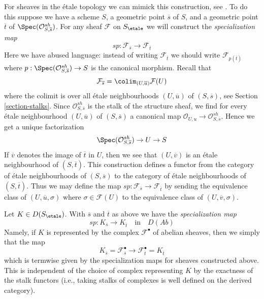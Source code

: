 \medskip\noindent
For sheaves in the \'etale topology we can mimick this construction, see
\cite[Exposee VII, 7.7, page 397]{SGA4}. To do this suppose we have
a scheme $S$, a geometric point $\overline{s}$ of $S$, and a geometric
point $\overline{t}$ of $\Spec(\mathcal{O}^{sh}_{S, \overline{s}})$.
For any sheaf $\mathcal{F}$ on $S_\etale$ we will construct the
{\it specialization map}
$$
sp : \mathcal{F}_{\overline{s}} \longrightarrow \mathcal{F}_{\overline{t}}
$$
Here we have abused language: instead of writing
$\mathcal{F}_{\overline{t}}$ we should write $\mathcal{F}_{p(\overline{t})}$
where $p : \Spec(\mathcal{O}^{sh}_{S, \overline{s}}) \to S$ is the canonical
morphism. Recall that
$$
\mathcal{F}_{\overline{s}} = \colim_{(U, \overline{u})} \mathcal{F}(U)
$$
where the colimit is over all \'etale neighbourhoods $(U, \overline{u})$
of $(S, \overline{s})$, see Section \ref{section-stalks}. Since
$\mathcal{O}^{sh}_{S, \overline{s}}$ is the stalk of the
structure sheaf, we find for every \'etale neighbourhood
$(U, \overline{u})$ of $(S, \overline{s})$ a canonical map
$\mathcal{O}_{U, u} \to \mathcal{O}^{sh}_{S, \overline{s}}$.
Hence we get a unique factorization
$$
\Spec(\mathcal{O}^{sh}_{S, \overline{s}}) \to U \to S
$$
If $\overline{v}$ denotes the image of $\overline{t}$ in $U$, then we see that
$(U, \overline{v})$ is an \'etale neighbourhood of $(S, \overline{t})$.
This construction defines a functor from the category of \'etale neighbourhoods
of $(S, \overline{s})$ to the category of \'etale neighbourhoods of
$(S, \overline{t})$. Thus we may define the map
$sp : \mathcal{F}_{\overline{s}} \to \mathcal{F}_{\overline{t}}$
by sending the equivalence class of
$(U, \overline{u}, \sigma)$ where $\sigma \in \mathcal{F}(U)$
to the equivalence class of $(U, \overline{v}, \sigma)$.

\medskip\noindent
Let $K \in D(S_\etale)$. With $\overline{s}$ and $\overline{t}$
as above we have the {\it specialization map}
$$
sp : K_{\overline{s}} \longrightarrow K_{\overline{t}}
\quad\text{in}\quad D(\textit{Ab})
$$
Namely, if $K$ is represented by the complex $\mathcal{F}^\bullet$
of abelian sheaves, then we simply that the map
$$
K_{\overline{s}} = \mathcal{F}^\bullet_{\overline{s}}
\longrightarrow
\mathcal{F}^\bullet_{\overline{t}} = K_{\overline{t}}
$$
which is termwise given by the specialization maps for sheaves
constructed above. This is independent of the choice of complex
representing $K$ by the exactness of the stalk functors (i.e.,
taking stalks of complexes is well defined on the derived category).

